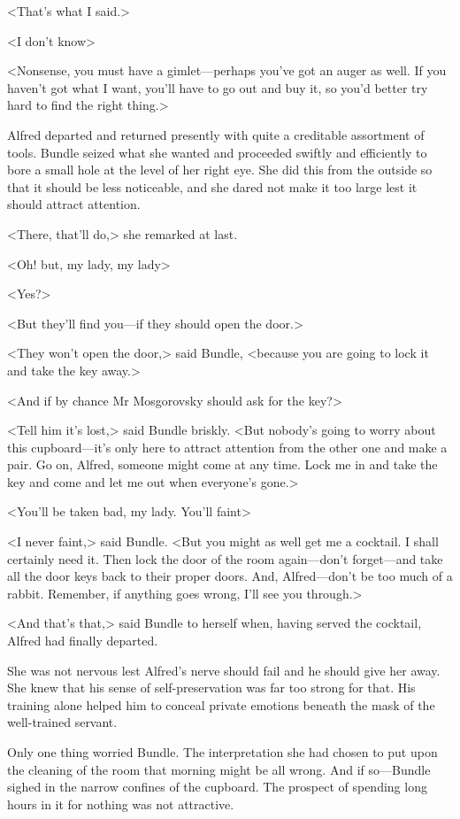 <That's what I said.>

<I don't know\longdash>

<Nonsense, you must have a gimlet—perhaps you've got an auger as well. If you haven't got what I want, you'll have to go out and buy it, so you'd better try hard to find the right thing.>

Alfred departed and returned presently with quite a creditable assortment of tools. Bundle seized what she wanted and proceeded swiftly and efficiently to bore a small hole at the level of her right eye. She did this from the outside so that it should be less noticeable, and she dared not make it too large lest it should attract attention.

<There, that'll do,> she remarked at last.

<Oh! but, my lady, my lady\longdash>

<Yes?>

<But they'll find you—if they should open the door.>

<They won't open the door,> said Bundle, <because you are going to lock it and take the key away.>

<And if by chance Mr Mosgorovsky should ask for the key?>

<Tell him it's lost,> said Bundle briskly. <But nobody's going to worry about this cupboard—it's only here to attract attention from the other one and make a pair. Go on, Alfred, someone might come at any time. Lock me in and take the key and come and let me out when everyone's gone.>

<You'll be taken bad, my lady. You'll faint\longdash>

<I never faint,> said Bundle. <But you might as well get me a cocktail. I shall certainly need it. Then lock the door of the room again—don't forget—and take all the door keys back to their proper doors. And, Alfred—don't be too much of a rabbit. Remember, if anything goes wrong, I'll see you through.>

<And that's that,> said Bundle to herself when, having served the cocktail, Alfred had finally departed.

She was not nervous lest Alfred's nerve should fail and he should give her away. She knew that his sense of self-preservation was far too strong for that. His training alone helped him to conceal private emotions beneath the mask of the well-trained servant.

Only one thing worried Bundle. The interpretation she had chosen to put upon the cleaning of the room that morning might be all wrong. And if so—Bundle sighed in the narrow confines of the cupboard. The prospect of spending long hours in it for nothing was not attractive.